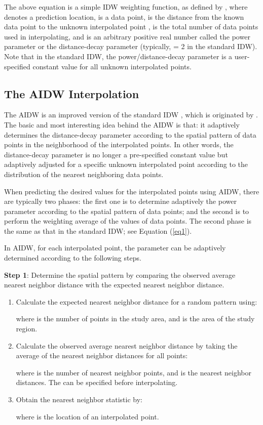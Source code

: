 \documentclass[final,5p,times,twocolumn,authoryear]{elsarticle}
\begin{document}
The above equation is a simple IDW weighting function, as defined by \cite{01Shepard:1968:TIF:800186.810616}, where  denotes a prediction location,  is a data 
point,  is the distance from the known data point  to the unknown 
interpolated point ,  is the total number of data points used in 
interpolating, and  is an arbitrary positive real number called the power 
parameter or the distance-decay parameter (typically,  = 2 in the 
standard IDW). Note that in the standard IDW, the power/distance-decay 
parameter  is a user-specified constant value for all unknown 
interpolated points. 

\subsection{The AIDW Interpolation}
The AIDW is an improved version of the standard IDW \citep{01Shepard:1968:TIF:800186.810616}, which is 
originated by \cite{28DBLP:journals/gandc/LuW08}. The basic and most interesting 
idea behind the AIDW is that: it adaptively determines the distance-decay 
parameter  according to the spatial pattern of data points in the 
neighborhood of the interpolated points. In other words, the distance-decay 
parameter  is no longer a pre-specified constant value but 
adaptively adjusted for a specific unknown interpolated point according to 
the distribution of the nearest neighboring data points.

When predicting the desired values for the interpolated points using AIDW, 
there are typically two phases: the first one is to determine adaptively the 
power parameter  according to the spatial pattern of data points; 
and the second is to perform the weighting average of the values of data 
points. The second phase is the same as that in the standard IDW; see 
Equation (\ref{eq1}).

In AIDW, for each interpolated point, the
parameter  can be adaptively determined according to the following steps.

\textbf{Step 1}: Determine the spatial pattern by comparing the observed 
average nearest neighbor distance with the expected nearest neighbor 
distance.

\begin{enumerate}[1)]
	\item Calculate the expected nearest neighbor distance  for a random pattern using:

where  is the number of points in the study area, and  is the area of the 
study region.

	\item Calculate the observed average nearest neighbor distance  by taking the average of the nearest neighbor distances for all points:


where  is the number of nearest neighbor points, and  is the 
nearest neighbor distances. The  can be specified before interpolating.


	\item Obtain the nearest neighbor statistic  by:


where  is the location of an interpolated point.
\end{enumerate}
\end{document}
